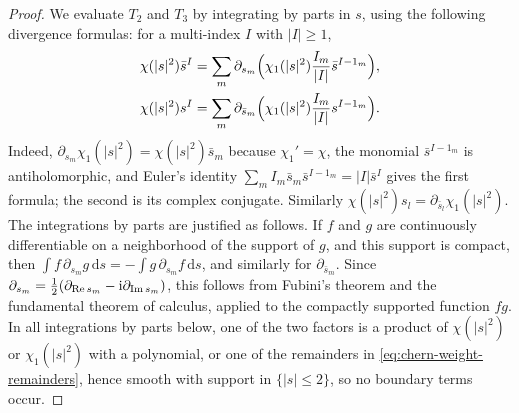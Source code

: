 \begin{proof}
We evaluate $T_2$ and $T_3$ by integrating by parts in $s$, using the following divergence formulas: for a multi-index $I$ with $|I|\geq1$,
\begin{equation}\label{eq:chern-weight-divergence}
\begin{aligned}
 \chi(|s|^2)\bar s^I&=\sum_m\partial_{s_m}\Bigl(\chi_1(|s|^2)\frac{I_m}{|I|}\bar s^{I-1_m}\Bigr),\\
 \chi(|s|^2)s^I&=\sum_m\partial_{\bar s_m}\Bigl(\chi_1(|s|^2)\frac{I_m}{|I|}s^{I-1_m}\Bigr).
\end{aligned}
\end{equation}
Indeed, $\partial_{s_m}\chi_1(|s|^2)=\chi(|s|^2)\bar s_m$ because $\chi_1'=\chi$, the monomial $\bar s^{I-1_m}$ is antiholomorphic, and Euler's identity $\sum_mI_m\bar s_m\bar s^{I-1_m}=|I|\bar s^I$ gives the first formula; the second is its complex conjugate. Similarly $\chi(|s|^2)s_l=\partial_{\bar s_l}\chi_1(|s|^2)$. The integrations by parts are justified as follows. If $f$ and $g$ are continuously differentiable on a neighborhood of the support of $g$, and this support is compact, then $\int f\,\partial_{s_m}g\,\mathrm ds=-\int g\,\partial_{s_m}f\,\mathrm ds$, and similarly for $\partial_{\bar s_m}$. Since $\partial_{s_m}=\frac12(\partial_{\operatorname{Re} s_m}-\mathrm i\partial_{\operatorname{Im} s_m})$, this follows from Fubini's theorem and the fundamental theorem of calculus, applied to the compactly supported function $fg$. In all integrations by parts below, one of the two factors is a product of $\chi(|s|^2)$ or $\chi_1(|s|^2)$ with a polynomial, or one of the remainders in \eqref{eq:chern-weight-remainders}, hence smooth with support in $\{|s|\leq2\}$, so no boundary terms occur.


\end{proof}
